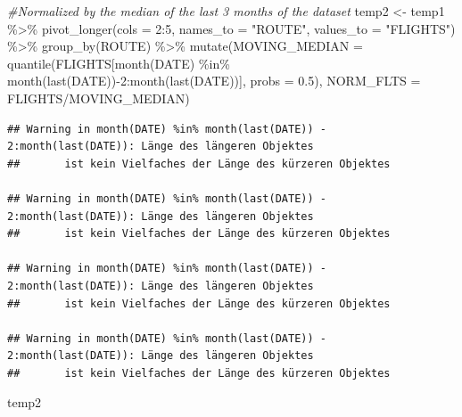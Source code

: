 \documentclass[conference,final,]{IEEEtran}
\newenvironment{Shaded}{\begin{snugshade}}{\end{snugshade}}
\newcommand{\AttributeTok}[1]{\textcolor[rgb]{0.77,0.63,0.00}{#1}}
\newcommand{\CommentTok}[1]{\textcolor[rgb]{0.56,0.35,0.01}{\textit{#1}}}
\newcommand{\DecValTok}[1]{\textcolor[rgb]{0.00,0.00,0.81}{#1}}
\newcommand{\FloatTok}[1]{\textcolor[rgb]{0.00,0.00,0.81}{#1}}
\newcommand{\FunctionTok}[1]{\textcolor[rgb]{0.00,0.00,0.00}{#1}}
\newcommand{\NormalTok}[1]{#1}
\newcommand{\OtherTok}[1]{\textcolor[rgb]{0.56,0.35,0.01}{#1}}
\newcommand{\SpecialCharTok}[1]{\textcolor[rgb]{0.00,0.00,0.00}{#1}}
\newcommand{\StringTok}[1]{\textcolor[rgb]{0.31,0.60,0.02}{#1}}
\begin{document}
\begin{Shaded}
\begin{Highlighting}[]
\CommentTok{\#Normalized by the median of the last 3 months of the dataset}
\NormalTok{temp2 }\OtherTok{\textless{}{-}}\NormalTok{ temp1 }\SpecialCharTok{\%\textgreater{}\%} \FunctionTok{pivot\_longer}\NormalTok{(}\AttributeTok{cols =} \DecValTok{2}\SpecialCharTok{:}\DecValTok{5}\NormalTok{, }\AttributeTok{names\_to =} \StringTok{"ROUTE"}\NormalTok{, }\AttributeTok{values\_to =} \StringTok{"FLIGHTS"}\NormalTok{) }\SpecialCharTok{\%\textgreater{}\%} \FunctionTok{group\_by}\NormalTok{(ROUTE) }\SpecialCharTok{\%\textgreater{}\%} \FunctionTok{mutate}\NormalTok{(}\AttributeTok{MOVING\_MEDIAN =} \FunctionTok{quantile}\NormalTok{(FLIGHTS[}\FunctionTok{month}\NormalTok{(DATE) }\SpecialCharTok{\%in\%} \FunctionTok{month}\NormalTok{(}\FunctionTok{last}\NormalTok{(DATE))}\SpecialCharTok{{-}}\DecValTok{2}\SpecialCharTok{:}\FunctionTok{month}\NormalTok{(}\FunctionTok{last}\NormalTok{(DATE))], }\AttributeTok{probs =} \FloatTok{0.5}\NormalTok{), }\AttributeTok{NORM\_FLTS =}\NormalTok{ FLIGHTS}\SpecialCharTok{/}\NormalTok{MOVING\_MEDIAN)}
\end{Highlighting}
\end{Shaded}

\begin{verbatim}
## Warning in month(DATE) %in% month(last(DATE)) - 2:month(last(DATE)): Länge des längeren Objektes
##       ist kein Vielfaches der Länge des kürzeren Objektes

## Warning in month(DATE) %in% month(last(DATE)) - 2:month(last(DATE)): Länge des längeren Objektes
##       ist kein Vielfaches der Länge des kürzeren Objektes

## Warning in month(DATE) %in% month(last(DATE)) - 2:month(last(DATE)): Länge des längeren Objektes
##       ist kein Vielfaches der Länge des kürzeren Objektes

## Warning in month(DATE) %in% month(last(DATE)) - 2:month(last(DATE)): Länge des längeren Objektes
##       ist kein Vielfaches der Länge des kürzeren Objektes
\end{verbatim}

\begin{Shaded}
\begin{Highlighting}[]
\NormalTok{temp2}
\end{Highlighting}
\end{Shaded}
\end{document}

